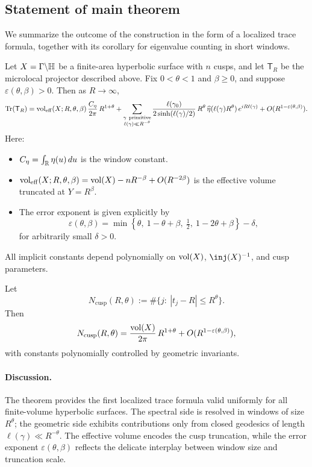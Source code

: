 \subsection{Statement of main theorem}\label{subsec:mainthm}

We summarize the outcome of the construction in the form of a localized trace formula,
together with its corollary for eigenvalue counting in short windows.

\begin{theorem}\label{thm:ltf}
Let $X=\Gamma\backslash\mathbb{H}$ be a finite-area hyperbolic surface with $n$ cusps, and let
$\mathsf{T}_R$ be the microlocal projector described above. Fix $0<\theta<1$ and
$\beta\geq 0$, and suppose $\varepsilon(\theta,\beta)>0$. Then as $R\to\infty$,
\[
  \mathrm{Tr}(\mathsf{T}_R) = \operatorname{vol}_{\mathrm{eff}}(X;R,\theta,\beta)\,
     \frac{C_\eta}{2\pi}\,R^{1+\theta}
    + \sum_{\substack{\gamma\ \mathrm{primitive}\\ \ell(\gamma)\ll R^{-\theta}}}
        \frac{\ell(\gamma_0)}{2\sinh(\ell(\gamma)/2)}\,
        R^\theta\,\widehat{\eta}(\ell(\gamma)R^\theta)\, e^{iR\ell(\gamma)}
    + O(R^{1-\varepsilon(\theta,\beta)}).
\]
Here:
\begin{itemize}
  \item $C_\eta = \int_{\mathbb{R}} \eta(u)\,du$ is the window constant.
  \item $\operatorname{vol}_{\mathrm{eff}}(X;R,\theta,\beta) = \operatorname{vol}(X) - nR^{-\beta} + O(R^{-2\beta})$
        is the effective volume truncated at $Y=R^\beta$.
  \item The error exponent is given explicitly by
        \[
          \varepsilon(\theta,\beta) = \min\!\left\{
              \theta,\ 1-\theta+\beta,\ \tfrac{1}{2},\ 1-2\theta+\beta
            \right\} - \delta,
        \]
        for arbitrarily small $\delta>0$.
\end{itemize}
All implicit constants depend polynomially on $\operatorname{vol}(X)$, $\inj(X)^{-1}$, and cusp
parameters.
\end{theorem}

\begin{corollary}\label{cor:windowed-weyl}
Let
\[
  N_{\mathrm{cusp}}(R,\theta) := \#\{j:\ |t_j - R|\leq R^\theta\}.
\]
Then
\[
  N_{\mathrm{cusp}}(R,\theta) = \frac{\operatorname{vol}(X)}{2\pi}\,R^{1+\theta}
     + O(R^{1-\varepsilon(\theta,\beta)}),
\]
with constants polynomially controlled by geometric invariants.
\end{corollary}

\paragraph{Discussion.}  
The theorem provides the first localized trace formula valid uniformly for all
finite-volume hyperbolic surfaces. The spectral side is resolved in windows of size
$R^\theta$; the geometric side exhibits contributions only from closed geodesics of length
$\ell(\gamma)\ll R^{-\theta}$. The effective volume encodes the cusp truncation, while the
error exponent $\varepsilon(\theta,\beta)$ reflects the delicate interplay between window
size and truncation scale.

